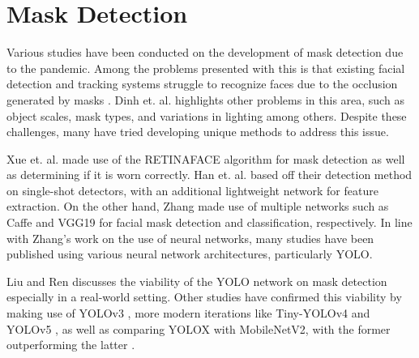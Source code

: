 \section{Mask Detection} \label{mask}

Various studies have been conducted on the development of mask detection due to the pandemic. Among the problems presented with this is that existing facial detection and tracking systems struggle to recognize faces due to the occlusion generated by masks \cite{dangeFaceMaskDetection2022, alayaryFaceMaskedUnmasked2022}. Dinh et. al. \cite{dinhMaskedFaceDetection2022} highlights other problems in this area, such as object scales, mask types, and variations in lighting among others. Despite these challenges, many have tried developing unique methods to address this issue.

Xue et. al. \cite{xueIntelligentDetectionRecognition2020} made use of the RETINAFACE algorithm for mask detection as well as determining if it is worn correctly. Han et. al. \cite{hanMaskDetectionMethod2020} based off their detection method on single-shot detectors, with an additional lightweight network for feature extraction. On the other hand, Zhang \cite{zhangRealTimeDeepTransfer2021} made use of multiple networks such as Caffe and VGG19 for facial mask detection and classification, respectively. In line with Zhang's work on the use of neural networks, many studies have been published using various neural network architectures, particularly YOLO.

Liu and Ren \cite{liuApplicationYoloMask2021} discusses the viability of the YOLO network on mask detection especially in a real-world setting. Other studies have confirmed this viability by making use of YOLOv3 \cite{sevillaMaskVisionMachineVisionBased2021}, more modern iterations like Tiny-YOLOv4 \cite{sathyamurthyRealtimeFaceMask2021} and YOLOv5 \cite{youssryAccurateRealTimeFace2022}, as well as comparing YOLOX with MobileNetV2, with the former outperforming the latter \cite{EvaluationYOLOXMobileNetV2}.
  